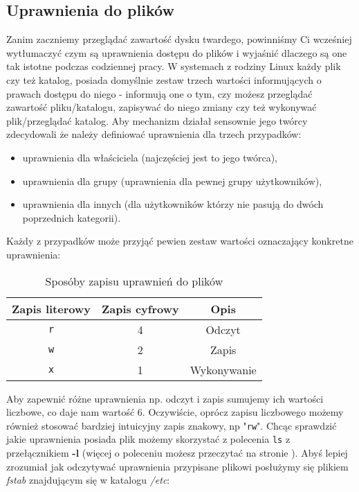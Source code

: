 \subsection{Uprawnienia do plików}
Zanim zaczniemy przeglądać zawartość dysku twardego, powinniśmy Ci wcześniej wytłumaczyć czym są uprawnienia dostępu do plików i wyjaśnić dlaczego są one tak istotne podczas codziennej pracy.
\newline
\newline
W systemach z rodziny Linux każdy plik czy też katalog, posiada domyślnie zestaw trzech wartości informujących o prawach dostępu do niego - informują one o tym, czy możesz przeglądać zawartość pliku/katalogu, zapisywać do niego zmiany czy też wykonywać plik/przeglądać katalog. Aby mechanizm działał sensownie jego twórcy zdecydowali że należy definiować uprawnienia dla trzech przypadków:
\begin{itemize}
\item uprawnienia dla właściciela (najczęściej jest to jego twórca),
\item uprawnienia dla grupy (uprawnienia dla pewnej grupy użytkowników),
\item uprawnienia dla innych (dla użytkowników którzy nie pasują do dwóch poprzednich kategorii).
\end{itemize}
Każdy z przypadków może przyjąć pewien zestaw wartości oznaczający konkretne uprawnienia:
\begin{table}[h]
\begin{center}
\begin{tabular}{|c|c|c|} \hline
Zapis literowy & Zapis cyfrowy & Opis \\ \hline
\texttt{r} & 4 & Odczyt \\ \hline
\texttt{w} & 2 & Zapis \\ \hline
\texttt{x} & 1 & Wykonywanie \\ \hline
\end{tabular}
\caption{Sposóby zapisu uprawnień do plików}
\label{tab:uprawnienia}
\end{center}
\end{table}
Aby zapewnić różne uprawnienia np. odczyt i zapis sumujemy ich wartości liczbowe, co daje nam wartość 6. Oczywiście, oprócz zapisu liczbowego możemy również stosować bardziej intuicyjny zapis znakowy, np "\texttt{rw}". Chcąc sprawdzić jakie uprawnienia posiada plik możemy skorzystać z polecenia \texttt{ls} z przełącznikiem \textbf{-l} (więcej o poleceniu możesz przeczytać na stronie \pageref{sec:ls}). Abyś lepiej zrozumiał jak odczytywać uprawnienia przypisane plikowi posłużymy się plikiem \textit{fstab} znajdującym się w katalogu \textit{/etc}:

